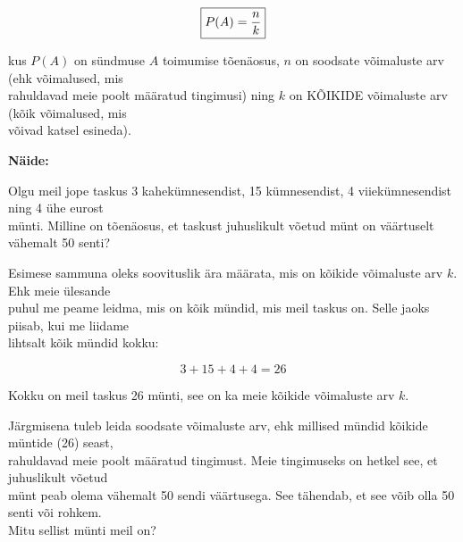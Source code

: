 \begin{center}
{{{\begin{flushleft}
\vspace{2mm}
\hspace{5mm}
\begin{equation}
\label{eq15_1}
\fbox{$P(A)=\dfrac{n}{k}$}
\end{equation}

\hspace{5mm}
kus $P(A)$ on sündmuse $A$ toimumise tõenäosus, $n$ on soodsate võimaluste arv (ehk võimalused, mis\\ \hspace{5mm} rahuldavad meie poolt määratud tingimusi) ning $k$ on KÕIKIDE võimaluste arv (kõik võimalused, mis\\ \hspace{5mm} võivad katsel esineda). 

\vspace{2mm}
\hspace{5mm}
\textbf{Näide:}

\vspace{2mm}
\hspace{5mm}
Olgu meil jope taskus 3 kahekümnesendist, 15 kümnesendist, 4 viiekümnesendist ning 4 ühe eurost\\ \hspace{5mm} münti. Milline on tõenäosus, et taskust juhuslikult võetud münt on väärtuselt vähemalt 50 senti?

\vspace{2mm}
\hspace{5mm}
Esimese sammuna oleks soovituslik ära määrata, mis on kõikide võimaluste arv $k$. Ehk meie ülesande\\ \hspace{5mm} puhul me peame leidma, mis on kõik mündid, mis meil taskus on. Selle jaoks piisab, kui me liidame\\ \hspace{5mm} lihtsalt kõik mündid kokku:

\vspace{2mm}
\hspace{5mm}
\[ 3+15+4+4=26 \]

\hspace{5mm}
Kokku on meil taskus 26 münti, see on ka meie kõikide võimaluste arv $k$.

\vspace{2mm}
\hspace{5mm}
Järgmisena tuleb leida soodsate võimaluste arv, ehk millised mündid kõikide müntide (26) seast,\\ \hspace{5mm} rahuldavad meie poolt määratud tingimust. Meie tingimuseks on hetkel see, et juhuslikult võetud\\ \hspace{5mm} münt peab olema vähemalt 50 sendi väärtusega. See tähendab, et see võib olla 50 senti või rohkem.\\ \hspace{5mm}  Mitu sellist münti meil on?


\end{flushleft}}}}
\end{center}
